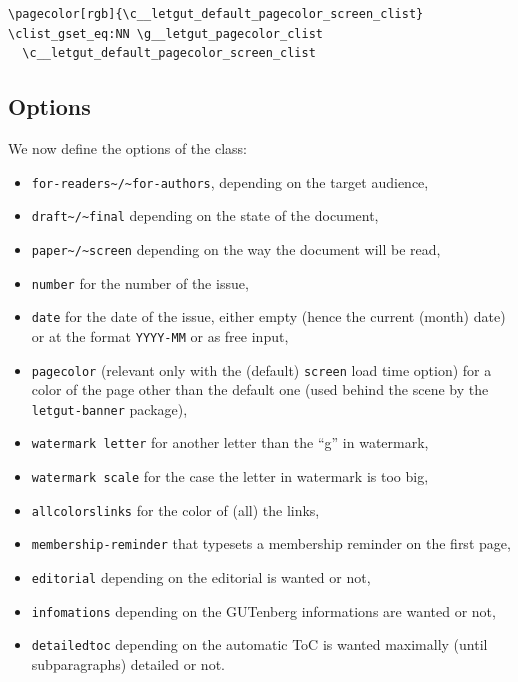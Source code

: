 \documentclass{letgut}
\begin{document}
\begin{lstlisting}
\pagecolor[rgb]{\c__letgut_default_pagecolor_screen_clist}
\clist_gset_eq:NN \g__letgut_pagecolor_clist
  \c__letgut_default_pagecolor_screen_clist
\end{lstlisting}
\subsection{Options}
\label{ImplementationOptions-imhg55h0jlj0}
We now define the options of the class:

\begin{itemize}
\item \lstinline+for-readers~/~for-authors+, depending on the target audience,
\item \lstinline+draft~/~final+ depending on the state of the document,
\item \lstinline+paper~/~screen+ depending on the way the document will be read,
\item \lstinline+number+ for the number of the issue,
\item \lstinline+date+ for the date of the issue, either empty (hence the current (month)
date) or at the format \lstinline+YYYY-MM+ or as free input,
\item \lstinline+pagecolor+ (relevant only with the (default) \lstinline+screen+ load time option) for
a color of the page other than the default one (used behind the scene by the
\lstinline+letgut-banner+ package),
\item \lstinline+watermark letter+ for another letter than the “g” in watermark,
\item \lstinline+watermark scale+ for the case the letter in watermark is too big,
\item \lstinline+allcolorslinks+ for the color of (all) the links,
\item \lstinline+membership-reminder+ that typesets a membership reminder on the first page,
\item \lstinline+editorial+ depending on the editorial is wanted or not,
\item \lstinline+infomations+ depending on the GUTenberg informations are wanted or not,
\item \lstinline+detailedtoc+ depending on the automatic ToC is wanted maximally (until
subparagraphs) detailed or not.
\end{itemize}
\end{document}
